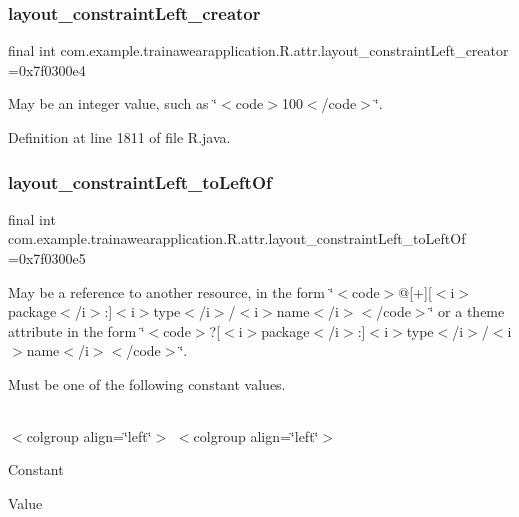 \subsubsection{\texorpdfstring{layout\_constraintLeft\_creator}{layout\_constraintLeft\_creator}}
{\footnotesize\ttfamily final int com.\+example.\+trainawearapplication.\+R.\+attr.\+layout\+\_\+constraint\+Left\+\_\+creator =0x7f0300e4\hspace{0.3cm}{\ttfamily [static]}}

May be an integer value, such as \char`\"{}$<$code$>$100$<$/code$>$\char`\"{}. 

Definition at line 1811 of file R.\+java.

\mbox{\label{classcom_1_1example_1_1trainawearapplication_1_1_r_1_1attr_a32b56b1a1b47120acbfe3856132294f4}} 
\subsubsection{\texorpdfstring{layout\_constraintLeft\_toLeftOf}{layout\_constraintLeft\_toLeftOf}}
{\footnotesize\ttfamily final int com.\+example.\+trainawearapplication.\+R.\+attr.\+layout\+\_\+constraint\+Left\+\_\+to\+Left\+Of =0x7f0300e5\hspace{0.3cm}{\ttfamily [static]}}

May be a reference to another resource, in the form \char`\"{}$<$code$>$@\mbox{[}+\mbox{]}\mbox{[}$<$i$>$package$<$/i$>$\+:\mbox{]}$<$i$>$type$<$/i$>$/$<$i$>$name$<$/i$>$$<$/code$>$\char`\"{} or a theme attribute in the form \char`\"{}$<$code$>$?\mbox{[}$<$i$>$package$<$/i$>$\+:\mbox{]}$<$i$>$type$<$/i$>$/$<$i$>$name$<$/i$>$$<$/code$>$\char`\"{}. 

Must be one of the following constant values.

\tabulinesep=1mm
\begin{longtabu}spread 0pt [c]{*{0}{|X[-1]}|}
\hline
\end{longtabu}
$<$colgroup align=\char`\"{}left\char`\"{}$>$ $<$colgroup align=\char`\"{}left\char`\"{}$>$ 

Constant

Value

